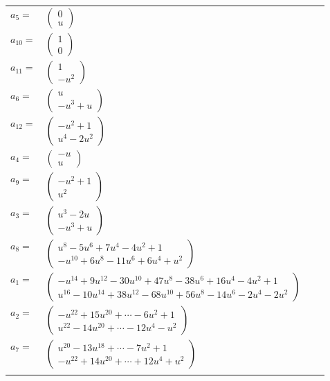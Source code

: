 \documentclass[1p]{elsarticle_modified}
\theoremstyle{definition}
\begin{document}
\begin{tabular}{m{7pt} m{180pt} m{7pt} m{180pt} }
\flushright $a_{5}=$&$\begin{pmatrix}0\\u\end{pmatrix}$ \\
\flushright $a_{10}=$&$\begin{pmatrix}1\\0\end{pmatrix}$ \\
\flushright $a_{11}=$&$\begin{pmatrix}1\\- u^2\end{pmatrix}$ \\
\flushright $a_{6}=$&$\begin{pmatrix}u\\- u^3+u\end{pmatrix}$ \\
\flushright $a_{12}=$&$\begin{pmatrix}- u^2+1\\u^4-2 u^2\end{pmatrix}$ \\
\flushright $a_{4}=$&$\begin{pmatrix}- u\\u\end{pmatrix}$ \\
\flushright $a_{9}=$&$\begin{pmatrix}- u^2+1\\u^2\end{pmatrix}$ \\
\flushright $a_{3}=$&$\begin{pmatrix}u^3-2 u\\- u^3+u\end{pmatrix}$ \\
\flushright $a_{8}=$&$\begin{pmatrix}u^8-5 u^6+7 u^4-4 u^2+1\\- u^{10}+6 u^8-11 u^6+6 u^4+u^2\end{pmatrix}$ \\
\flushright $a_{1}=$&$\begin{pmatrix}- u^{14}+9 u^{12}-30 u^{10}+47 u^8-38 u^6+16 u^4-4 u^2+1\\u^{16}-10 u^{14}+38 u^{12}-68 u^{10}+56 u^8-14 u^6-2 u^4-2 u^2\end{pmatrix}$ \\
\flushright $a_{2}=$&$\begin{pmatrix}- u^{22}+15 u^{20}+\cdots-6 u^2+1\\u^{22}-14 u^{20}+\cdots-12 u^4- u^2\end{pmatrix}$ \\
\flushright $a_{7}=$&$\begin{pmatrix}u^{20}-13 u^{18}+\cdots-7 u^2+1\\- u^{22}+14 u^{20}+\cdots+12 u^4+u^2\end{pmatrix}$\\&\end{tabular}
\end{document}
